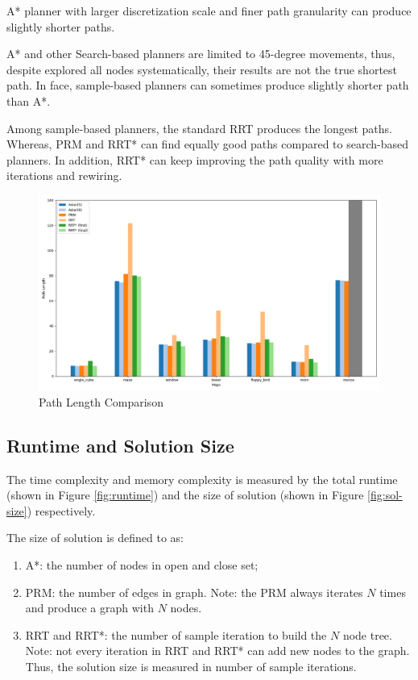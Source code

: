 \documentclass[conference]{IEEEtran}
\begin{document}
A* planner with larger discretization scale and finer path granularity can
produce slightly shorter paths. 

A* and other Search-based planners are limited to 45-degree movements,
thus, despite explored all nodes systematically, 
their results are not the true shortest path.
In face, sample-based planners can sometimes produce slightly shorter path than A*.

Among sample-based planners, 
the standard RRT produces the longest paths. 
Whereas, PRM and RRT* can find equally good paths compared to search-based planners.
In addition, RRT* can keep improving the path quality with more iterations and rewiring.

\begin{figure}[h]
    \centering
    \includegraphics[width=\linewidth]{img/path_length.png}
    \caption{Path Length Comparison}
    \label{fig:path-length}
\end{figure}


\subsection{Runtime and Solution Size}
The time complexity and memory complexity is measured by 
the total runtime (shown in Figure \ref{fig:runtime}) and
the size of solution (shown in Figure \ref{fig:sol-size}) respectively.

The size of solution
is defined to as:
\begin{enumerate}
    \item A*: the number of nodes in open and close set;
    \item PRM: the number of edges in graph. 
    Note: the PRM always iterates $N$ times and produce a graph with $N$ nodes.
    \item RRT and RRT*: the number of sample iteration to build the $N$ node tree. 
    Note: not every iteration in RRT and RRT* can add new nodes to the graph.
    Thus, the solution size is measured in number of sample iterations.
\end{enumerate}
\end{document}
